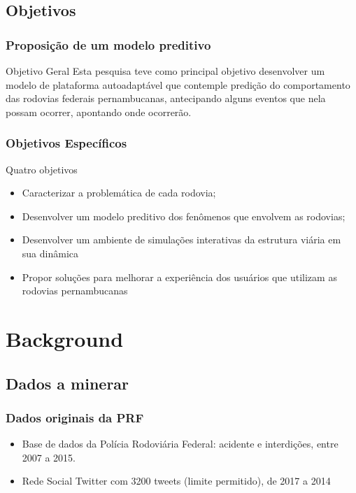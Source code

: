 \documentclass[11pt]{beamer}
\begin{document}
\subsection{ Objetivos}

\begin{frame}\frametitle{Proposição de um modelo preditivo}
	\pause
	\begin{block}{ Objetivo Geral}
		Esta pesquisa teve como principal objetivo desenvolver um modelo de plataforma autoadaptável 
		\pause que contemple predição do comportamento das rodovias federais pernambucanas,
		\pause antecipando alguns eventos que nela possam ocorrer, apontando onde ocorrerão.
		
	\end{block}
\end{frame}

\begin{frame}\frametitle{ Objetivos Específicos}
	\pause
	\begin{block}{ Quatro objetivos}
		\begin{itemize}
			\item Caracterizar a problemática de cada rodovia;
			\pause
			\item Desenvolver um modelo preditivo dos fenômenos que envolvem as rodovias;
			\pause
			\item Desenvolver um ambiente de simulações interativas da estrutura viária em sua dinâmica
			\pause			
			\item Propor soluções para melhorar a experiência dos usuários que utilizam as rodovias pernambucanas
		\end{itemize}
		
	\end{block}
\end{frame}

\section{Background}
\subsection{Dados a minerar}

\begin{frame}\frametitle{Dados originais da PRF}
	\begin{itemize}
		\item Base de dados da Polícia Rodoviária Federal: acidente e interdições, entre 2007 a 2015.
		\pause
		\item Rede Social Twitter com 3200 tweets (limite permitido), de 2017 a 2014
	\end{itemize}	
\end{frame}
\end{document}

